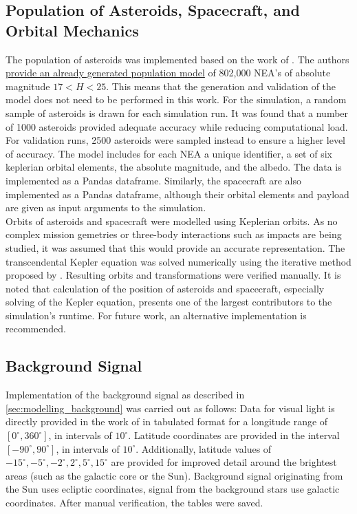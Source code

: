 \subsection{Population of Asteroids, Spacecraft, and Orbital Mechanics}
The population of asteroids was implemented based on the work of \cite{GranvikPopulation}. The authors \href{http://www.iki.fi/mgranvik/data/Granvik+\_2018\_Icarus}{provide an already generated population model} of 802,000 NEA's of absolute magnitude $17 < H < 25$. This means that the generation and validation of the model does not need to be performed in this work. For the simulation, a random sample of asteroids is drawn for each simulation run. It was found that a number of 1000 asteroids provided adequate accuracy while reducing computational load. For validation runs, 2500 asteroids were sampled instead to ensure a higher level of accuracy. The model includes for each NEA a unique identifier, a set of six keplerian orbital elements, the absolute magnitude, and the albedo. The data is implemented as a Pandas dataframe. Similarly, the spacecraft are also implemented as a Pandas dataframe, although their orbital elements and payload are given as input arguments to the simulation. \\

Orbits of asteroids and spacecraft were modelled using Keplerian orbits. As no complex mission gemetries or three-body interactions such as impacts are being studied, it was assumed that this would provide an accurate representation. The transcendental Kepler equation was solved numerically using the iterative method proposed by \cite{KeplerEquation}. Resulting orbits and transformations were verified manually. It is noted that calculation of the position of asteroids and spacecraft, especially solving of the Kepler equation, presents one of the largest contributors to the simulation's runtime. For future work, an alternative implementation is recommended.

\subsection{Background Signal}
Implementation of the background signal as described in \autoref{sec:modelling_background} was carried out as follows: Data for visual light is directly provided in the work of \cite{LightOfTheNightSky} in tabulated format for a longitude range of $[0^\circ, 360^\circ]$, in intervals of $10^\circ$. Latitude coordinates are provided in the interval $[-90^\circ, 90^\circ]$, in intervals of $10^\circ$. Additionally, latitude values of $-15^\circ, -5^\circ, -2^\circ, 2^\circ, 5^\circ, 15^\circ$ are provided for improved detail around the brightest areas (such as the galactic core or the Sun). Background signal originating from the Sun uses ecliptic coordinates, signal from the background stars use galactic coordinates. After manual verification, the tables were saved. \\

